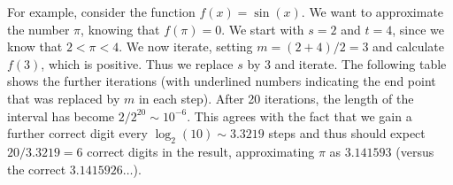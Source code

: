 For example, consider the function $f(x)=\sin(x)$. We want to approximate the number
$\pi$, knowing
that $f(\pi)=0$. We start with $s=2$ and $t=4$, since we know that
$2<\pi<4$. We now iterate, setting $m=(2+4)/2=3$ and calculate $f(3)$, which is
positive. Thus we replace $s$ by $3$ and iterate. The following table shows the
further iterations (with underlined numbers indicating the end point that was replaced
by $m$ in each step).
After 20 iterations, the length of the interval has become $2/2^{20}\sim 10^{-6}$. This
agrees with the fact that we gain a further correct digit every
$\log_2(10)\sim 3.3219$ steps and thus should expect $20/3.3219=6$ correct digits in the result,
approximating $\pi$ as $3.141593$ (versus the correct $3.1415926\ldots$).
